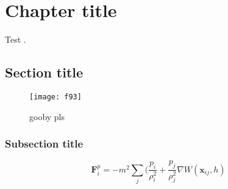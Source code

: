 \chapter{Chapter title}
	Test \cite{Bee12}.

	\section{Section title}
		\lipsum[1]
	\begin{figure}[h!]
  		\centering
   		 \texttt{[image: f93]}
   		 \label{fig:herp}
		\caption{gooby pls}
	\end{figure}

	\subsection{Subsection title}
		\lipsum[1]
		\begin{equation}
		\textbf{F}_i^p = -m^2\sum_j (\frac{p_i}{\rho_i^2} + \frac{p_j}{\rho_j^2} \nabla W(\textbf{x}_{ij},h)
		\end{equation}